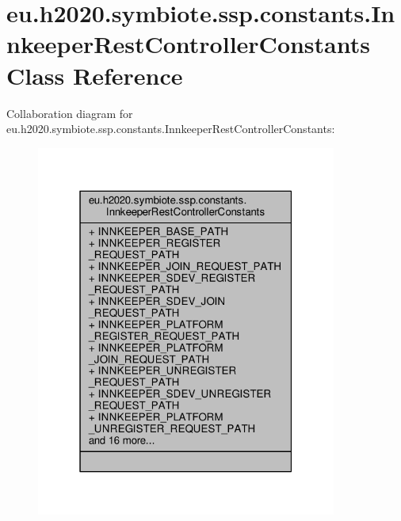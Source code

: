 \hypertarget{classeu_1_1h2020_1_1symbiote_1_1ssp_1_1constants_1_1InnkeeperRestControllerConstants}{}\section{eu.\+h2020.\+symbiote.\+ssp.\+constants.\+Innkeeper\+Rest\+Controller\+Constants Class Reference}
\label{classeu_1_1h2020_1_1symbiote_1_1ssp_1_1constants_1_1InnkeeperRestControllerConstants}


Collaboration diagram for eu.\+h2020.\+symbiote.\+ssp.\+constants.\+Innkeeper\+Rest\+Controller\+Constants\+:
\nopagebreak
\begin{figure}[H]
\begin{center}
\leavevmode
\includegraphics[width=280pt]{classeu_1_1h2020_1_1symbiote_1_1ssp_1_1constants_1_1InnkeeperRestControllerConstants__coll__graph}
\end{center}
\end{figure}
